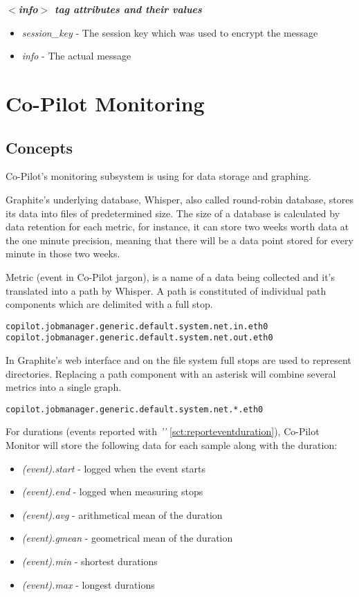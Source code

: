 \emph{\bf $<$info$>$ tag attributes and their values}
\begin{itemize}
  \item \emph{session\_key} - The session key which was used to encrypt the message
  \item \emph{info} - The actual message
 \end{itemize}



\section{Co-Pilot Monitoring}

\subsection{Concepts}
Co-Pilot's monitoring subsystem is using \cite{graphite} for data storage and graphing.


Graphite's underlying database, Whisper, also called round-robin database, stores its data into files of predetermined size.
The size of a database is calculated by data retention for each metric, for instance, it can store two weeks worth data at the one minute precision, meaning
that there will be a data point stored for every minute in those two weeks.

Metric (event in Co-Pilot jargon), is a name of a data being collected and it's translated into a path by Whisper.
A path is constituted of individual path components which are delimited with a full stop.

\lstset{caption=Example Graphite paths}
\begin{lstlisting}
copilot.jobmanager.generic.default.system.net.in.eth0
copilot.jobmanager.generic.default.system.net.out.eth0
\end{lstlisting}

In Graphite's web interface and on the file system full stops are used to represent directories.
Replacing a path component with an asterisk will combine several metrics into a single graph.

\lstset{caption=Combined Graphite path}
\begin{lstlisting}
copilot.jobmanager.generic.default.system.net.*.eth0
\end{lstlisting}

For durations (events reported with \emph{''} \ref{sct:reporteventduration}),
Co-Pilot Monitor will store the following data for each sample along with the duration:
\begin{itemize}
  \item \emph{(event).start} - logged when the event starts
  \item \emph{(event).end} - logged when measuring stops
  \item \emph{(event).avg} - arithmetical mean of the duration
  \item \emph{(event).gmean} - geometrical mean of the duration
  \item \emph{(event).min} - shortest durations
  \item \emph{(event).max} - longest durations
\end{itemize}


